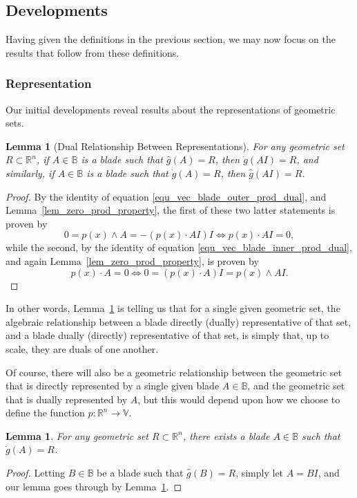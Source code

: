 \documentclass{birkjour}
\newtheorem{lem}[thm]{Lemma}
\theoremstyle{definition}
\theoremstyle{remark}
\numberwithin{equation}{section}
\newcommand{\R}{\mathbb{R}}
\newcommand{\B}{\mathbb{B}}
\newcommand{\V}{\mathbb{V}}
\newcommand{\gd}{\dot{g}}
\newcommand{\gh}{\hat{g}}
\begin{document}
\subsection{Developments}

Having given the definitions in the previous section, we may now focus on the results that follow
from these definitions.

\subsubsection{Representation}

Our initial developments reveal results about the representations of geometric sets.

\begin{lem}[Dual Relationship Between Representations]\label{lem_dual_relationship_in_rep}
For any geometric set $R\subset\R^n$, if $A\in\B$ is a blade such that $\gh(A)=R$,
then $\gd(AI)=R$, and similarly, if $A\in\B$ is a blade such that $\gd(A)=R$, then $\gh(AI)=R$.
\end{lem}
\begin{proof}
By the identity of equation \eqref{equ_vec_blade_outer_prod_dual}, and Lemma~\ref{lem_zero_prod_property},
the first of these two latter statements is proven by
\begin{equation}
0=p(x)\wedge A=-(p(x)\cdot AI)I\iff p(x)\cdot AI=0,
\end{equation}
while the second, by the identity of equation \eqref{equ_vec_blade_inner_prod_dual},
and again Lemma~\ref{lem_zero_prod_property}, is proven by
\begin{equation}
p(x)\cdot A=0\iff 0=(p(x)\cdot A)I=p(x)\wedge AI.
\end{equation}
\end{proof}

In other words, Lemma~\ref{lem_dual_relationship_in_rep} is telling us that for a single given geometric set, the
algebraic relationship between a blade directly (dually) representative of that set,
and a blade dually (directly) representative of that set, is simply that, up to scale, they
are duals of one another.

Of course, there will also be a geometric relationship between the geometric set that is directly represented by a single
given blade $A\in\B$, and the geometric set that is dually represented by $A$, but this would depend upon how we choose to define
the function $p:\R^n\to\V$.

\begin{lem}
For any geometric set $R\subset\R^n$, there exists a blade $A\in\B$ such that
$\gd(A)=R$.
\end{lem}
\begin{proof}
Letting $B\in\B$ be a blade such that $\gh(B)=R$, simply let $A=BI$, and our
lemma goes through by Lemma~\ref{lem_dual_relationship_in_rep}.
\end{proof}
\end{document}
